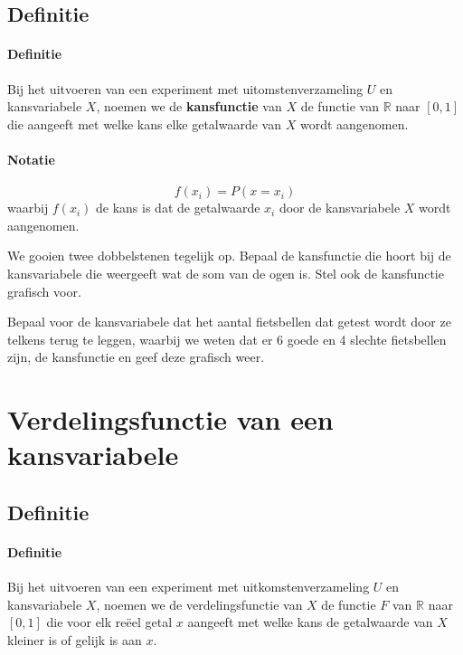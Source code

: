 \documentclass[12pt,twoside]{article}
\begin{document}
\pagebreak
\subsection{Definitie}

\paragraph*{Definitie}
\begin{mdframed}
Bij het uitvoeren van een experiment met uitomstenverzameling $U$ en kansvariabele $X$, noemen we de {\bf kansfunctie} van $X$ de functie van $\mathbb{R}$ naar $[0,1]$ die aangeeft met welke kans elke getalwaarde van $X$ wordt aangenomen.
\end{mdframed}

\paragraph*{Notatie}
$$f(x_i)=P(x=x_i)$$
waarbij $f(x_i)$ de kans is dat de getalwaarde $x_i$ door de kansvariabele $X$ wordt aangenomen.

\begin{oefening}
We gooien twee dobbelstenen tegelijk op. Bepaal de kansfunctie die hoort bij de kansvariabele die weergeeft wat de som van de ogen is. Stel ook de kansfunctie grafisch voor.
\end{oefening}

\begin{oefening}
Bepaal voor de kansvariabele dat het aantal fietsbellen dat getest wordt door ze telkens terug te leggen, waarbij we weten dat er 6 goede en 4 slechte fietsbellen zijn, de kansfunctie en geef deze grafisch weer.
\end{oefening}

\pagebreak

\section{Verdelingsfunctie van een kansvariabele}

\subsection{Definitie}

\paragraph*{Definitie}
\begin{mdframed}
Bij het uitvoeren van een experiment met uitkomstenverzameling $U$ en kansvariabele $X$, noemen we de verdelingsfunctie van $X$ de functie $F$ van $\mathbb{R}$ naar $[0,1]$ die voor elk reëel getal $x$ aangeeft met welke kans de getalwaarde van $X$ kleiner is of gelijk is aan $x$.
\end{mdframed}
\end{document}
